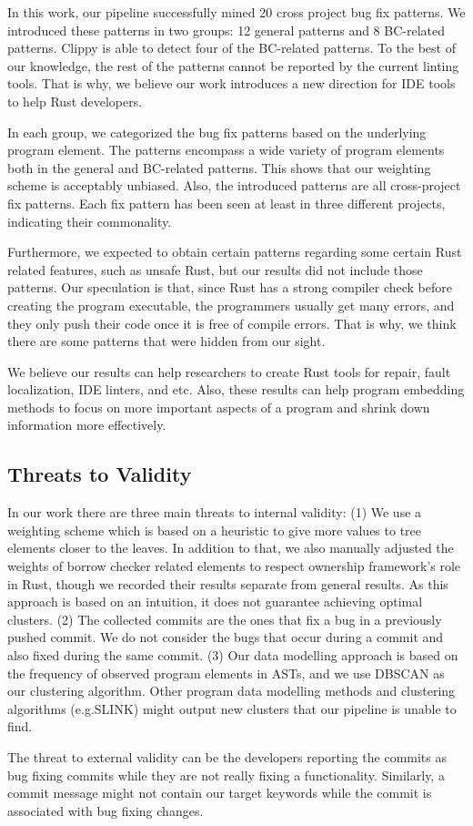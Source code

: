 In this work, our pipeline successfully mined 20 cross project bug fix patterns. We introduced these patterns in two groups: 12 general patterns and 8 BC-related patterns. Clippy is able to detect four of the BC-related patterns. To the best of our knowledge, the rest of the patterns cannot be reported by the current linting tools. That is why, we believe our work introduces a new direction for IDE tools to help Rust developers.

In each group, we categorized the bug fix patterns based on the underlying program element. The patterns encompass a wide variety of program elements both in the general and BC-related patterns. This shows that our weighting scheme is acceptably unbiased. Also, the introduced patterns are all cross-project fix patterns. Each fix pattern has been seen at least in three different projects, indicating their commonality.

Furthermore, we expected to obtain certain patterns regarding some certain Rust related features, such as unsafe Rust, but our results did not include those patterns. Our speculation is that, since Rust has a strong compiler check before creating the program executable, the programmers usually get many errors, and they only push their code once it is free of compile errors. That is why, we think there are some patterns that were hidden from our sight.

We believe our results can help researchers to create Rust tools for repair, fault localization, IDE linters, and etc. Also, these results can help program embedding methods to focus on more important aspects of a program and shrink down information more effectively.

\subsection{Threats to Validity}

In our work there are three main threats to internal validity: (1) We use a weighting scheme which is based on a heuristic to give more values to tree elements closer to the leaves. In addition to that, we also manually adjusted the weights of borrow checker related elements to respect ownership framework's role in Rust, though we recorded their results separate from general results. As this approach is based on an intuition, it does not guarantee achieving optimal clusters. (2) The collected commits are the ones that fix a bug in a previously pushed commit. We do not consider the bugs that occur during a commit and also fixed during the same commit. (3) Our data modelling approach is based on the frequency of observed program elements in ASTs, and we use DBSCAN as our clustering algorithm. Other program data modelling methods and clustering algorithms (e.g.SLINK) might output new clusters that our pipeline is unable to find. 

The threat to external validity can be the developers reporting the commits as bug fixing commits while they are not really fixing a functionality. Similarly, a commit message might not contain our target keywords while the commit is associated with bug fixing changes.

